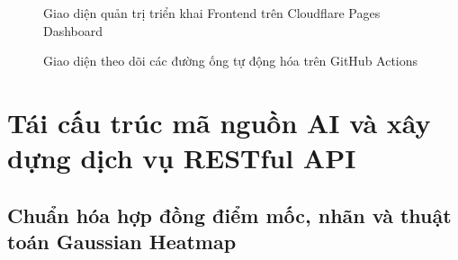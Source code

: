 \begin{figure}[H]
\centering
{}
\caption{Giao diện quản trị triển khai Frontend trên Cloudflare Pages Dashboard}
\label{fig:cloudflare_dashboard}
\end{figure}

\begin{figure}[H]
\centering
{}
\caption{Giao diện theo dõi các đường ống tự động hóa trên GitHub Actions}
\label{fig:github_workflows}
\end{figure}

\section{Tái cấu trúc mã nguồn AI và xây dựng dịch vụ RESTful API}
\label{sec:refactor_ai_api}

\subsection{Chuẩn hóa hợp đồng điểm mốc, nhãn và thuật toán Gaussian Heatmap}
\label{subsec:chuan_hoa_heatmap}


